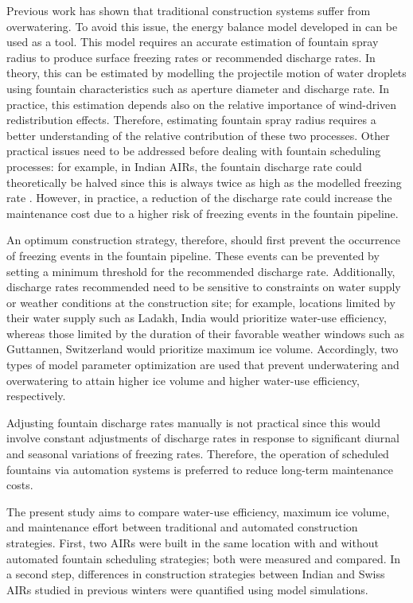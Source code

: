 \documentclass[tc, manuscript]{copernicus}
\begin{document}
Previous work \citep{balasubramanianInfluenceMeteorologicalConditions2022} has shown that traditional
construction systems suffer from overwatering. To avoid this issue, the energy balance model developed in
\cite{balasubramanianInfluenceMeteorologicalConditions2022} can be used as a tool. This model requires an
accurate estimation of fountain spray radius to produce surface freezing rates or recommended discharge rates.
In theory, this can be estimated by modelling the projectile motion of water droplets using fountain
characteristics such as aperture diameter and discharge rate. In practice, this estimation depends also on the
relative importance of wind-driven redistribution effects. Therefore, estimating fountain spray radius requires
a better understanding of the relative contribution of these two processes. Other practical issues need to be
addressed before dealing with fountain scheduling processes: for example, in Indian AIRs, the fountain discharge
rate could theoretically be halved since this is always twice as high as the modelled freezing rate
\citep{balasubramanianInfluenceMeteorologicalConditions2022}. However, in practice, a reduction of the discharge
rate could increase the maintenance cost due to a higher risk of freezing events in the fountain pipeline.

An optimum construction strategy, therefore, should first prevent the occurrence of freezing events in the
fountain pipeline. These events can be prevented by setting a minimum threshold for the recommended discharge
rate. Additionally, discharge rates recommended need to be sensitive to constraints on water supply or weather
conditions at the construction site; for example, locations limited by their water supply such as Ladakh, India
would prioritize water-use efficiency, whereas those limited by the duration of their favorable weather windows
such as Guttannen, Switzerland would prioritize maximum ice volume. Accordingly, two types of model parameter
optimization are used that prevent underwatering and overwatering to attain higher ice volume and higher
water-use efficiency, respectively.

Adjusting fountain discharge rates manually is not practical since this would involve constant adjustments of
discharge rates in response to significant diurnal and seasonal variations of freezing rates. Therefore, the
operation of scheduled fountains via automation systems is preferred to reduce long-term maintenance costs.

The present study aims to compare water-use efficiency, maximum ice volume, and maintenance effort between
traditional and automated construction strategies. First, two AIRs were built in the same location with and
without automated fountain scheduling strategies; both were measured and compared. In a second step, differences
in construction strategies between Indian and Swiss AIRs studied in previous winters were quantified using model
simulations. 
\end{document}
